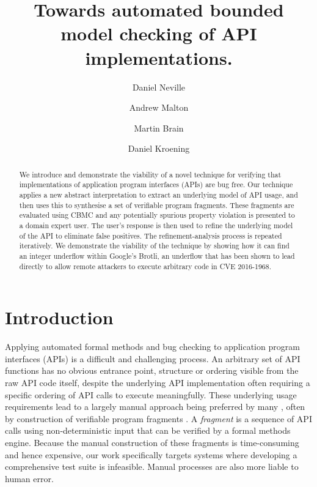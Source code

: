 \documentclass[EPiC]{easychair}
\title{Towards automated bounded model checking of API implementations.}
\author{
Daniel Neville \inst{1, 2, 3}
\and
    Andrew Malton\inst{1, 4}
\and
   Martin Brain\inst{2, 5}
\and 
	Daniel Kroening\inst {2,6}
}
\institute{
	CHACE Centre for High Assurance Computing, Blackberry Ltd.,  Waterloo, Canada
\and
   University of Oxford,
   Oxford, U.K.\\
\and
  \email{daniel.neville@cs.ox.ac.uk}\\
\and
  \email{amalton@blackberry.com}\\
\and
   \email{martin.brain@cs.ox.ac.uk}\\
\and
	\email{kroening@cs.ox.ac.uk}\\
 }
\begin{document}
\maketitle

\begin{abstract}
We introduce and demonstrate the viability of a novel technique for verifying that implementations of application program interfaces (APIs) are bug free.  Our technique applies a new abstract interpretation to extract an underlying model of API usage, and then uses this to synthesise a set of verifiable program fragments. These fragments are evaluated using CBMC and any potentially spurious property violation is presented to a domain expert user.  The user's response is then used to refine the underlying model of the API to eliminate false positives.
The refinement-analysis process is repeated iteratively.   We demonstrate the viability of the technique by showing how it can find an integer underflow within Google's Brotli, an underflow that has been shown to lead directly to allow remote attackers to execute arbitrary code in CVE 2016-1968. 
\end{abstract}



\pagestyle{empty}

\section{Introduction}
\label{sect:introduction}
Applying automated formal methods and bug checking to application program interfaces (APIs) is a difficult and challenging process.  
An arbitrary set of API functions has no obvious entrance point, structure or ordering visible from the raw API code itself, despite the underlying API implementation often requiring  a specific ordering of API calls to execute meaningfully.     
These underlying usage requirements lead to a largely manual approach being  preferred by many \cite{BestAPITestingPractices}, often by construction of verifiable program fragments \cite{HowToTest}.  A \textit{fragment} is a sequence of API calls using non-deterministic input that can be verified by a formal methods engine.
Because the manual construction of these fragments is time-consuming and hence expensive, our work specifically targets systems where developing a comprehensive test suite is infeasible.  Manual processes are also more liable to human error.
   
\end{document}
